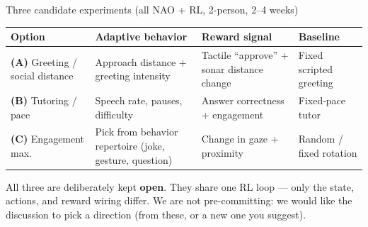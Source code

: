 \documentclass[aspectratio=169,10pt]{beamer}
\begin{document}
\begin{frame}{Three candidate experiments (all NAO + RL, 2-person, 2--4 weeks)}
  \footnotesize
  \begin{table}
    \begin{tabular}{@{}>{\raggedright\arraybackslash}p{2.4cm}>{\raggedright\arraybackslash}p{3.1cm}>{\raggedright\arraybackslash}p{3.0cm}>{\raggedright\arraybackslash}p{2.6cm}@{}}
      \toprule
      \textbf{Option} & \textbf{Adaptive behavior} & \textbf{Reward signal} & \textbf{Baseline} \\
      \midrule
      \textbf{(A)} Greeting / social distance & Approach distance + greeting intensity & Tactile ``approve'' + sonar distance change & Fixed scripted greeting \\
      \addlinespace
      \textbf{(B)} Tutoring / pace & Speech rate, pauses, difficulty & Answer correctness + engagement & Fixed-pace tutor \\
      \addlinespace
      \textbf{(C)} Engagement max. & Pick from behavior repertoire (joke, gesture, question) & Change in gaze + proximity & Random / fixed rotation \\
      \bottomrule
    \end{tabular}
  \end{table}
  \vspace{0.4em}
  All three are deliberately kept \textbf{open}. They share one RL loop --- only the state, actions, and reward wiring differ. \alert{We are not pre-committing}: we would like the discussion to pick a direction (from these, or a new one you suggest).
\end{frame}
\end{document}
